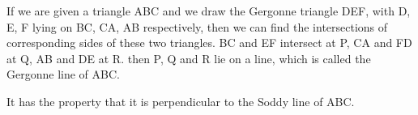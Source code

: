 If we are given a triangle ABC and we draw the Gergonne triangle DEF, with
D, E, F lying on BC, CA, AB respectively, then we can find the intersections
of corresponding sides of these two triangles. BC and EF intersect at P,
CA and FD at Q, AB and DE at R. then P, Q and R lie on a line, which is 
called the Gergonne line of ABC.
\par
It has the property that it is perpendicular to the Soddy line of ABC.